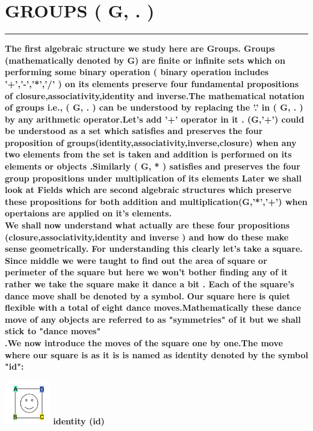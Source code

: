 \documentclass{article}
\begin{document}
\section * {GROUPS ( G, . )}
\hrule 
\bigskip
\textbf{ The first algebraic structure we study here are Groups. Groups (mathematically denoted by G) are finite or infinite sets which on performing some binary operation ( binary operation includes '+','-','*','/' ) on its elements preserve four fundamental propositions of closure,associativity,identity and inverse.The mathematical notation of groups i.e., ( G, . ) can be understood by replacing the '.' in ( G, . ) by any arithmetic operator.Let's add '+' operator in it . (G,'+') could be understood as a set which satisfies and preserves the four proposition of groups(identity,associativity,inverse,closure) when any two elements from the set is taken and addition is performed on its elements or objects .Similarly ( G, * ) satisfies and preserves the four group propositions under multiplication of  its elements 
Later we shall look at Fields which are second algebraic structures which preserve these propositions  for both addition and multiplication(G,'*','+') when opertaions are applied on it's elements.}
\\
\textbf{ We shall now understand what actually are these four propositions (closure,associativity,identity and inverse ) and how do these make sense geometrically.
For understanding this clearly let's take a square. Since middle we were taught to find out the area of square or perimeter of the square but here we won't bother finding any of it rather we take the square make it dance a bit . Each of the square's dance move shall be denoted by a symbol.}
\pagebreak
\textbf{Our square here is quiet flexible with a total of eight dance moves.Mathematically these dance move of any objects are referred to as "symmetries"  of it but we shall stick to "dance moves" \\ .We now introduce the moves of the square one by one.The move where our square is as it is is named as identity denoted by the symbol "id":}
\begin{center}
    \includegraphics[scale = 0.9,width =2cm]{images/identity.png}
    \center\textbf{identity  (id) }
\end{center}
\end{document}
